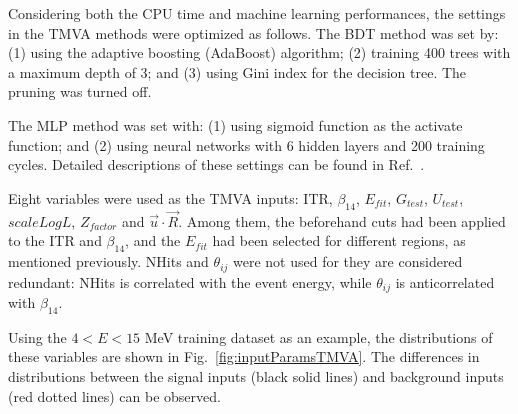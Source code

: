 Considering both the CPU time and machine learning performances, the settings in the TMVA methods were optimized as follows. The BDT method was set by: (1) using the adaptive boosting (AdaBoost) algorithm; (2) training 400 trees with a maximum depth of 3; and (3) using Gini index for the decision tree. The pruning was turned off.

The MLP method was set with: (1) using sigmoid function as the activate function; and (2) using neural networks with 6 hidden layers and 200 training cycles. Detailed descriptions of these settings can be found in Ref.~\cite{albertsson2007tmva}.

Eight variables were used as the TMVA inputs: ITR, $\beta_{14}$, $E_{fit}$, $G_{test}$, $U_{test}$, $scaleLogL$, $Z_{factor}$ and $\vec{u}\cdot \vec{R}$. Among them, the beforehand cuts had been applied to the ITR and $\beta_{14}$, and the $E_{fit}$ had been selected for different regions, as mentioned previously. NHits and $\theta_{ij}$ were not used for they are considered redundant: NHits is correlated with the event energy, while $\theta_{ij}$ is anticorrelated with $\beta_{14}$.

Using the $4<E<15$ MeV training dataset as an example, the distributions of these variables are shown in Fig.~\ref{fig:inputParamsTMVA}. The differences in distributions between the signal inputs (black solid lines) and background inputs (red dotted lines) can be observed.

